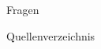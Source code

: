 \documentclass{beamer}
\begin{document}
\begin{frame}
	\Huge{\centerline{Fragen}}
\end{frame}
\begin{frame}[allowframebreaks]{Quellenverzeichnis}
\scriptsize{}
\end{frame}
\end{document}
